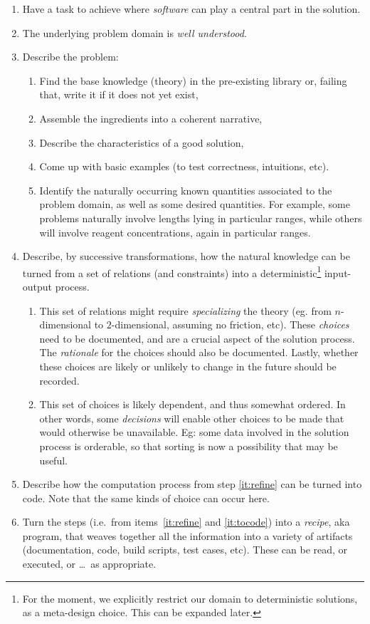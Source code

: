 \documentclass[sigconf,review]{acmart}
\begin{document}
\begin{enumerate}
\item\label{it:problem} Have a task to achieve where
\emph{software} can play a central part in the solution.
\item\label{it:understood} The underlying problem domain
is \emph{well understood}.
\item\label{it:probdesc} Describe the problem:
  \begin{enumerate}
  \item Find the base knowledge (theory) in the pre-existing library
    or, failing that, write it if it does not yet exist,
  \item Assemble the ingredients into a coherent narrative,
  \item Describe the characteristics of a good solution,
  \item Come up with basic examples (to test correctness, intuitions, etc).
  \item Identify the naturally occurring known quantities associated to the
    problem domain, as well as some desired quantities. For example,
    some problems naturally involve lengths lying in particular
    ranges, while others will involve reagent concentrations, again
    in particular ranges.
  \end{enumerate}
\item\label{it:refine} Describe, by successive transformations, how the natural
knowledge can be turned from a set of relations (and constraints) into a
deterministic\footnote{For the moment, we explicitly restrict our domain to
deterministic solutions, as a meta-design choice. This can be expanded later.}
input-output process.
  \begin{enumerate}
  \item This set of relations might require \emph{specializing} the
    theory (eg. from $n$-dimensional to $2$-dimensional, assuming no
    friction, etc).  These \emph{choices} need to be documented, and are
    a crucial aspect of the solution process. The \emph{rationale} for the
    choices should also be documented. Lastly, whether these choices are
    likely or unlikely to change in the future should be recorded.
  \item This set of choices is likely dependent, and thus somewhat ordered.
  In other words, some \emph{decisions} will enable other choices to be
  made that would otherwise be unavailable. Eg: some data involved in the
  solution process is orderable, so that sorting is now a possibility that
  may be useful.
  \end{enumerate}
\item\label{it:tocode} Describe how the computation process from step
\ref{it:refine} can be turned into code. Note that the same kinds of choice
can occur here.
\item\label{it:recipe} Turn the steps (i.e.\ from items~\ref{it:refine} and
\ref{it:tocode}) into a \emph{recipe}, aka program, that weaves together all the
information into a variety of artifacts (documentation, code, build scripts,
test cases, etc). These can be read, or executed, or \ldots\, as appropriate.
\end{enumerate}
\end{document}
